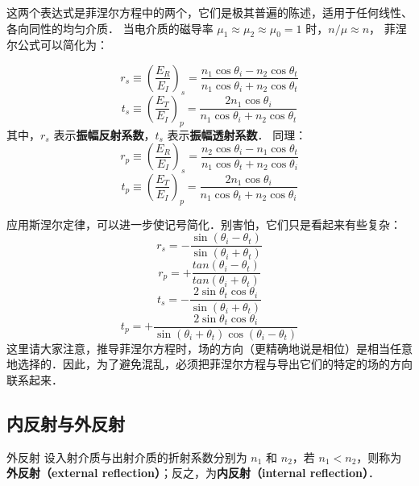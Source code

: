这两个表达式是菲涅尔方程中的两个，它们是极其普遍的陈述，适用于任何线性、各向同性的均匀介质．%
当电介质的磁导率 $\mu_1\approx\mu_2\approx\mu_0=1$ 时，$n/\mu \approx n$， 菲涅尔公式可以简化为：

\begin{equation}\label{Fresnl_eq3}
r_s \equiv \left(\frac{E_R}{E_I}\right)_s = \frac{n_1\cos{\theta_i} - n_2\cos\theta_t}{n_1\cos\theta_i + n_2\cos\theta_t}
\end{equation}
\begin{equation}\label{Fresnl_eq4}
t_s \equiv \left(\frac{E_T}{E_I}\right)_p =  \frac{2 n_1\cos\theta_i}{n_1\cos\theta_i + n_2\cos\theta_t}
\end{equation}
其中，$r_s$ 表示\textbf{振幅反射系数}，$t_s$ 表示\textbf{振幅透射系数}．
同理：
\begin{equation}\label{Fresnl_eq5}
r_p \equiv \left(\frac{E_R}{E_I}\right)_s = \frac{n_2\cos{\theta_i} - n_1\cos\theta_t}{n_1\cos\theta_t + n_2\cos\theta_i}
\end{equation}
\begin{equation}\label{Fresnl_eq6}
t_p \equiv \left(\frac{E_T}{E_I}\right)_p =  \frac{2 n_1\cos\theta_i}{n_1\cos\theta_t + n_2\cos\theta_i}
\end{equation}

应用斯涅尔定律，可以进一步使记号简化．别害怕，它们只是看起来有些复杂：
\begin{equation}\label{Fresnl_eq7}
r_s = -\frac{\sin(\theta_i - \theta_t)}{\sin(\theta_i + \theta_t)}
\end{equation}
\begin{equation}\label{Fresnl_eq8}
r_p = +\frac{tan(\theta_i - \theta_t)}{tan(\theta_i + \theta_t)}
\end{equation}
\begin{equation}\label{Fresnl_eq9}
t_s = -\frac{2\sin\theta_t\cos\theta_i}{\sin(\theta_i + \theta_t)}
\end{equation}
\begin{equation}\label{Fresnl_eq10}
t_p = +\frac{2\sin\theta_t\cos\theta_i}{\sin(\theta_i + \theta_t)\cos(\theta_i - \theta_t)}
\end{equation}
这里请大家注意，推导菲涅尔方程时，场的方向（更精确地说是相位）是相当任意地选择的．因此，为了避免混乱，必须把菲涅尔方程与导出它们的特定的场的方向联系起来．

\subsection{内反射与外反射}
\begin{definition}{外反射}
设入射介质与出射介质的折射系数分别为 $n_1$ 和 $n_2$，若 $n_1<n_2$，则称为\textbf{外反射（external reflection）}；反之，为\textbf{内反射（internal reflection）}．
\end{definition}

